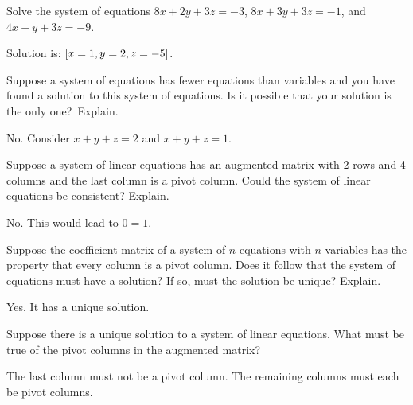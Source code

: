 \begin{ex}
  Solve the system of equations
  $8x+2y+3z=-3$, $8x+3y+3z=-1$, and $4x+y+3z=-9$.
  \begin{sol}
    Solution is: $\left[x=1,y=2,z=-5\right]$.
  \end{sol}
\end{ex}

\begin{ex}
  Suppose a system of equations has fewer equations than variables and
  you have found a solution to this system of equations. Is it possible that
  your solution is the only one?\ Explain.
  \begin{sol}
    No. Consider $x+y+z=2$ and $x+y+z=1$.
  \end{sol}
\end{ex}

\begin{ex}
  Suppose a system of linear equations has an augmented
  matrix with 2 rows and 4 columns and the last column is a pivot
  column. Could the system of linear equations be consistent? Explain.
  \begin{sol}
    No. This would lead to $0=1$.
  \end{sol}
\end{ex}

\begin{ex}
  Suppose the coefficient matrix of a system of $n$ equations with $n$
  variables has the property that every column is a pivot column. Does it
  follow that the system of equations must have a solution? If so, must the
  solution be unique? Explain.
  \begin{sol}
    Yes. It has a unique solution.
  \end{sol}
\end{ex}

\begin{ex}
  Suppose there is a unique solution to a system of linear equations.
  What must be true of the pivot columns in the augmented matrix?
  \begin{sol}
    The last column must not be a pivot column. The remaining columns must each be pivot
    columns.
  \end{sol}
\end{ex}

